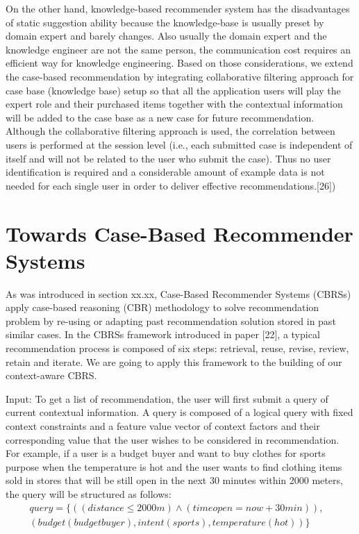 On the other hand, knowledge-based recommender system has the disadvantages of static suggestion ability because the knowledge-base is usually preset by domain expert and barely changes. Also usually the domain expert and the knowledge engineer are not the same person, the communication cost requires an efficient way for knowledge engineering. Based on those considerations, we extend the case-based recommendation by integrating collaborative filtering approach for case base (knowledge base) setup so that all the application users will play the expert role and their purchased items together with the contextual information will be added to the case base as a new case for future recommendation. Although the collaborative filtering approach is used, the correlation between users is performed at the session level (i.e., each submitted case is independent of itself and will not be related to the user who submit the case). Thus no user identification is required and a considerable amount of example data is not needed for each single user in order to deliver effective recommendations.[26])

\section{Towards Case-Based Recommender Systems} \label{sec:tcbrs}

As was introduced in section xx.xx, Case-Based Recommender Systems (CBRSs) apply case-based reasoning (CBR) methodology to solve recommendation problem by re-using or adapting past recommendation solution stored in past similar cases. In the CBRSs framework introduced in paper [22], a typical recommendation process is composed of six steps: retrieval, reuse, revise, review, retain and iterate. We are going to apply this framework to the building of our context-aware CBRS.

Input: To get a list of recommendation, the user will first submit a query of current contextual information. A query is composed of a logical query with fixed context constraints and a feature value vector of context factors and their corresponding value that the user wishes to be considered in recommendation. For example, if a user is a budget buyer and want to buy clothes for sports purpose when the temperature is hot and the user wants to find clothing items sold in stores that will be still open in the next 30 minutes within 2000 meters, the query will be structured as follows:
\begin{equation} \label{eq:query}
\begin{split}
	query =  \{((distance \leq 2000m)\wedge(timeopen = now+30min)), &\\
	              (budget (budget buyer), intent (sports), temperature (hot))\} &
\end{split}
\end{equation}

